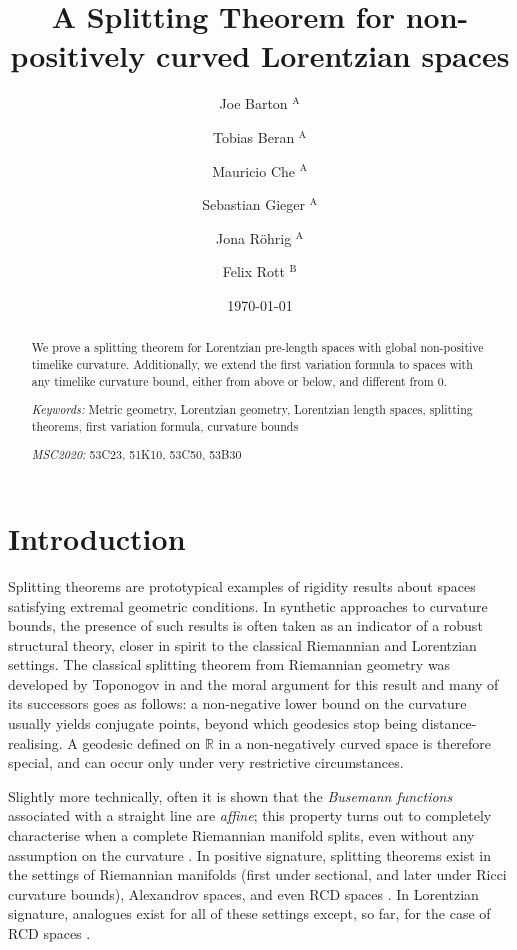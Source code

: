 \documentclass[11pt,reqno]{amsart}
\title[Splitting Theorem for non-positively curved Lorentzian spaces]{A Splitting Theorem for non-positively curved Lorentzian spaces}
\author[Barton]{Joe Barton $^\mathrm{A}$}
\author[Beran]{Tobias Beran $^\mathrm{A}$}
\author[Che]{Mauricio Che $^\mathrm{A}$}
\author[Gieger]{Sebastian Gieger $^\mathrm{A}$}
\author[R\"ohrig]{Jona R\"ohrig $^\mathrm{A}$}
\author[Rott]{Felix Rott $^\mathrm{B}$}
\date{\today}
\theoremstyle{definition}
\theoremstyle{definition}
\theoremstyle{plain}
\theoremstyle{remark}
\newcommand{\R}{\mathbb R}
\begin{document}
\begin{abstract}
We prove a splitting theorem for Lorentzian pre-length spaces with global non-positive timelike curvature. 
Additionally, we extend the first variation formula to spaces with any timelike curvature bound, either from above or below, and different from 0.
\bigskip

\noindent
\emph{Keywords:} Metric geometry, Lorentzian geometry, Lorentzian length spaces, splitting theorems, first variation formula, curvature bounds
\medskip

\noindent
\emph{MSC2020:}
53C23, %
51K10, %
53C50, %
53B30 %
\end{abstract}

\maketitle
\tableofcontents

\section{Introduction}
Splitting theorems are prototypical examples of rigidity results about spaces satisfying extremal geometric conditions. In synthetic approaches to curvature bounds, the presence of such results is often taken as an indicator of a robust structural theory, closer in spirit to the classical Riemannian and Lorentzian settings. 
The classical splitting theorem from Riemannian geometry was developed by Toponogov in \cite{Top59, Top64} and the moral argument for this result and many of its successors goes as follows: a non-negative lower bound on the curvature usually yields conjugate points, beyond which geodesics stop being distance-realising. A geodesic defined on $\R$ in a non-negatively curved space is therefore special, and can occur only under very restrictive circumstances.

Slightly more technically, often it is shown that the \emph{Busemann functions} associated with a straight line are \emph{affine}; this property turns out to completely characterise when a complete Riemannian manifold splits, even without any assumption on the curvature \cite{Inn82}.
In positive signature, splitting theorems exist in the settings of Riemannian manifolds (first under sectional, and later under Ricci curvature bounds), Alexandrov spaces, and even RCD spaces \cite{CG71, Gig14,Mil67}. 
In Lorentzian signature, analogues exist for all of these settings except, so far, for the case of RCD spaces \cite{BEMG85b, BEMG85a, BORS23,  Esc88, Gal89, New90}. 
\end{document}

